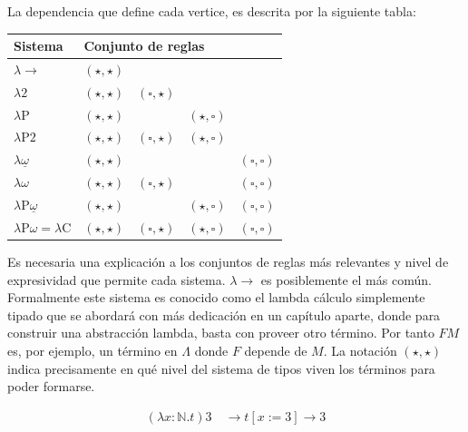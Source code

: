 La dependencia que define cada vertice, es descrita por la siguiente tabla:
\newline
\begin{center}
\begin{tabular}{|l|llll|}
\hline
Sistema & \multicolumn{4}{l|}{Conjunto de reglas} \\
\hline
$\lambda{\rightarrow}$                       & $(\star,\star)$ &                 &                 &                     \\
$\lambda 2$                                   & $(\star,\star)$ & $(\square,\star)$ &                 &                     \\
$\lambda\mathrm{P}$                           & $(\star,\star)$ &                 & $(\star,\square)$ &                     \\
$\lambda\mathrm{P}2$                          & $(\star,\star)$ & $(\square,\star)$ & $(\star,\square)$ &                     \\
$\lambda\underline{\omega}$                   & $(\star,\star)$ &                 &                 & $(\square,\square)$ \\
$\lambda\omega$                               & $(\star,\star)$ & $(\square,\star)$ &                 & $(\square,\square)$ \\
$\lambda\mathrm{P}\underline{\omega}$         & $(\star,\star)$ &                 & $(\star,\square)$ & $(\square,\square)$ \\
$\lambda\mathrm{P}\omega = \lambda\mathrm{C}$ & $(\star,\star)$ & $(\square,\star)$ & $(\star,\square)$ & $(\square,\square)$ \\
\hline
\end{tabular}
\end{center}
\medskip

\indent Es necesaria una explicación a los conjuntos de reglas más relevantes y nivel de expresividad que permite cada sistema. $\lambda\to$ es posiblemente el más común. Formalmente este sistema es conocido como el lambda cálculo simplemente tipado que se abordará con más dedicación en un capítulo aparte, donde para construir una abstracción lambda, basta con proveer otro término. Por tanto $FM$ es, por ejemplo, un término en $\Lambda$ donde $F$ depende de $M$. La notación $(\star, \star)$ indica precisamente en qué nivel del sistema de tipos viven los términos para poder formarse.
\begin{example}
\begin{align}
(\lambda x : \mathbb{N} . t) 3
\quad \longrightarrow t[x := 3] \longrightarrow 3
\end{align}
\end{example}

